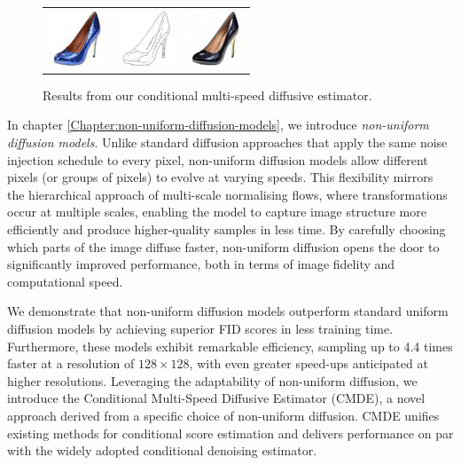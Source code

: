 \begin{figure}[h]
\begin{center}
\begin{tabular}{ccc}
        \includegraphics[width=.13\textwidth]{Outline/figures/non-uniform-diffusion-models/189_x.png} &   
        \includegraphics[width=.13\textwidth]{Outline/figures/non-uniform-diffusion-models/189_y.png} &
        \includegraphics[width=.13\textwidth]{Outline/figures/non-uniform-diffusion-models/189_2.png}  \\
    \end{tabular}
    \end{center}
    \caption{Results from our conditional multi-speed diffusive estimator.}
    \label{fig: teaser}
\end{figure}

In chapter \ref{Chapter:non-uniform-diffusion-models}, we introduce \emph{non-uniform diffusion models}. Unlike standard diffusion approaches that apply the same noise injection schedule to every pixel, non-uniform diffusion models allow different pixels (or groups of pixels) to evolve at varying speeds. This flexibility mirrors the hierarchical approach of multi-scale normalising flows, where transformations occur at multiple scales, enabling the model to capture image structure more efficiently and produce higher-quality samples in less time. By carefully choosing which parts of the image diffuse faster, non-uniform diffusion opens the door to significantly improved performance, both in terms of image fidelity and computational speed.

We demonstrate that non-uniform diffusion models outperform standard uniform diffusion models by achieving superior FID scores in less training time. Furthermore, these models exhibit remarkable efficiency, sampling up to 4.4 times faster at a resolution of $128 \times 128$, with even greater speed-ups anticipated at higher resolutions. Leveraging the adaptability of non-uniform diffusion, we introduce the Conditional Multi-Speed Diffusive Estimator (CMDE), a novel approach derived from a specific choice of non-uniform diffusion. CMDE unifies existing methods for conditional score estimation and delivers performance on par with the widely adopted conditional denoising estimator.

